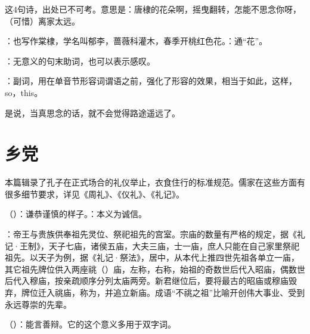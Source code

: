 {
\item {}这4句诗，出处已不可考。意思是：唐棣的花朵啊，摇曳翻转，怎能不思念你呀，（可惜）离家太远。

：也写作棠棣，学名叫郁李，蔷薇科灌木，春季开桃红色花。：通“花”。

：无意义的句末助词，也可以表示感叹。

：副词，用在单音节形容词谓语之前，强化了形容的效果，相当于如此，这样，so，this。


\item {}是说，当真思念的话，就不会觉得路途遥远了。
}
{}



\chapter{乡党}

本篇辑录了孔子在正式场合的礼仪举止，衣食住行的标准规范。儒家在这些方面有很多细节要求，详见《周礼》、《仪礼》、《礼记》。%

\bigskip

{
\item {}（）：谦恭谨慎的样子。：本义为诚信。
\item {}：帝王与贵族供奉祖先灵位、祭祀祖先的宫室。宗庙的数量有严格的规定，据《礼记·王制》，天子七庙，诸侯五庙，大夫三庙，士一庙，庶人只能在自己家里祭祀祖先。以天子为例，据《礼记·祭法》，居中，从本代上推四世先祖各单立一庙，其它祖先牌位供入两座祧（）庙，左称，右称，始祖的奇数世后代入昭庙，偶数世后代入穆庙，按亲疏顺序分列太庙两旁。新君继位后，要将最古的昭庙或穆庙毁弃，牌位迁入祧庙，称为，并追立新庙。成语“不祧之祖”比喻开创伟大事业、受到永远尊崇的先辈。 %
\item {}（）：能言善辩。它的这个意义多用于双字词。
}
{}


